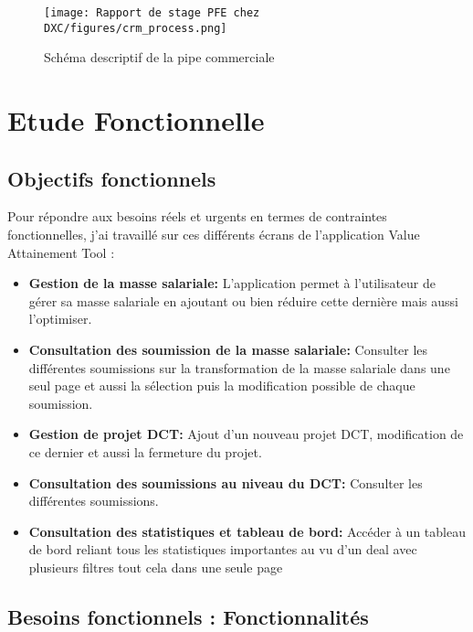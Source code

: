 \begin{figure}[!h]
    \centering
    \texttt{[image: Rapport de stage PFE chez DXC/figures/crm\_process.png]}
    \caption{Schéma descriptif de la pipe commerciale}
\end{figure}

\newpage
\section{Etude Fonctionnelle}

\subsection{Objectifs fonctionnels}

Pour répondre aux besoins réels et urgents en termes de contraintes fonctionnelles, j'ai travaillé sur ces différents écrans de l'application Value Attainement Tool :
\\
\begin{itemize}
    \item \textbf{Gestion de la masse salariale:} L'application permet à l'utilisateur de gérer sa masse salariale en ajoutant ou bien réduire cette dernière mais aussi l'optimiser.
    \\
    \item \textbf{Consultation des soumission de la masse salariale:} Consulter les différentes soumissions sur la transformation de la masse salariale dans une seul page et aussi la sélection puis la modification possible de chaque soumission.
    \\
    \item \textbf{Gestion de projet DCT:} Ajout d'un nouveau projet DCT, modification de ce dernier et aussi la fermeture du projet.
    \\
    \item \textbf{Consultation des soumissions au niveau du DCT:} Consulter les différentes soumissions.
    \\
    \item \textbf{Consultation des statistiques et tableau de bord:} Accéder à un tableau de bord reliant tous les statistiques importantes au vu d'un deal avec plusieurs filtres tout cela dans une seule page
\end{itemize}

\subsection{Besoins fonctionnels : Fonctionnalités}

